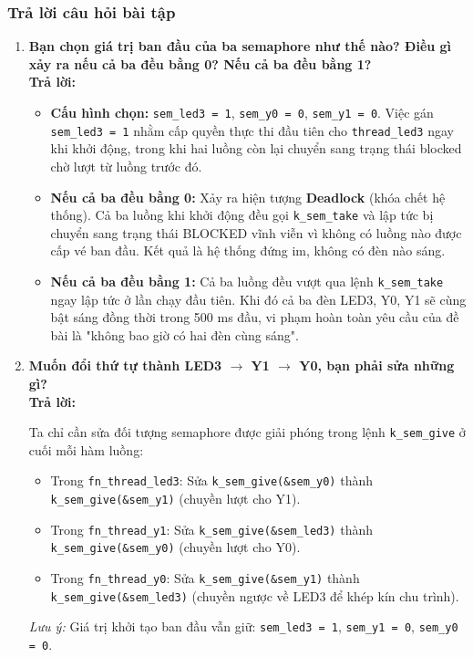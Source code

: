 \subsubsection{Trả lời câu hỏi bài tập}
\begin{enumerate}[label=(\alph*)]
    \item \textbf{Bạn chọn giá trị ban đầu của ba semaphore như thế nào? Điều gì xảy ra nếu cả ba đều bằng 0? Nếu cả ba đều bằng 1?} \\
    \textbf{Trả lời:}
    \begin{itemize}
        \item \textbf{Cấu hình chọn:} \texttt{sem\_led3 = 1}, \texttt{sem\_y0 = 0}, \texttt{sem\_y1 = 0}. Việc gán \texttt{sem\_led3 = 1} nhằm cấp quyền thực thi đầu tiên cho \texttt{thread\_led3} ngay khi khởi động, trong khi hai luồng còn lại chuyển sang trạng thái blocked chờ lượt từ luồng trước đó.
        \item \textbf{Nếu cả ba đều bằng 0:} Xảy ra hiện tượng \textbf{Deadlock} (khóa chết hệ thống). Cả ba luồng khi khởi động đều gọi \texttt{k\_sem\_take} và lập tức bị chuyển sang trạng thái BLOCKED vĩnh viễn vì không có luồng nào được cấp vé ban đầu. Kết quả là hệ thống đứng im, không có đèn nào sáng.
        \item \textbf{Nếu cả ba đều bằng 1:} Cả ba luồng đều vượt qua lệnh \texttt{k\_sem\_take} ngay lập tức ở lần chạy đầu tiên. Khi đó cả ba đèn LED3, Y0, Y1 sẽ cùng bật sáng đồng thời trong 500 ms đầu, vi phạm hoàn toàn yêu cầu của đề bài là "không bao giờ có hai đèn cùng sáng".
    \end{itemize}
    
    \item \textbf{Muốn đổi thứ tự thành LED3 $\rightarrow$ Y1 $\rightarrow$ Y0, bạn phải sửa những gì?} \\
    \textbf{Trả lời:} 
	
	Ta chỉ cần sửa đối tượng semaphore được giải phóng trong lệnh \texttt{k\_sem\_give} ở cuối mỗi hàm luồng:
    \begin{itemize}
        \item Trong \texttt{fn\_thread\_led3}: Sửa \texttt{k\_sem\_give(\&sem\_y0)} thành \texttt{k\_sem\_give(\&sem\_y1)} (chuyền lượt cho Y1).
        \item Trong \texttt{fn\_thread\_y1}: Sửa \texttt{k\_sem\_give(\&sem\_led3)} thành \texttt{k\_sem\_give(\&sem\_y0)} (chuyền lượt cho Y0).
        \item Trong \texttt{fn\_thread\_y0}: Sửa \texttt{k\_sem\_give(\&sem\_y1)} thành \texttt{k\_sem\_give(\&sem\_led3)} (chuyền ngược về LED3 để khép kín chu trình).
    \end{itemize}
    \textit{Lưu ý:} Giá trị khởi tạo ban đầu vẫn giữ: \texttt{sem\_led3 = 1}, \texttt{sem\_y1 = 0}, \texttt{sem\_y0 = 0}.
\end{enumerate}


